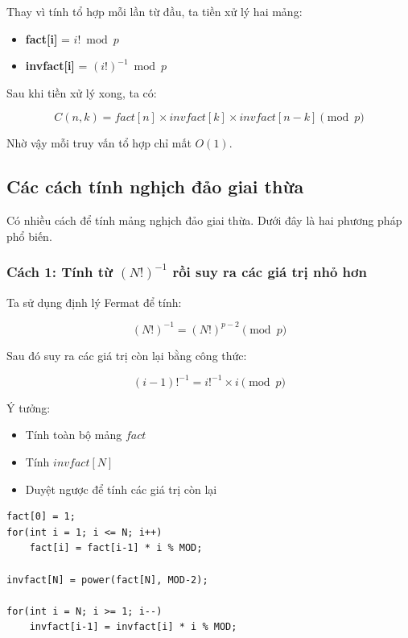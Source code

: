 Thay vì tính tổ hợp mỗi lần từ đầu, ta tiền xử lý hai mảng:

\begin{itemize}
\item \textbf{fact[i]} = $i! \bmod p$
\item \textbf{invfact[i]} = $(i!)^{-1} \bmod p$
\end{itemize}

Sau khi tiền xử lý xong, ta có:

\[
C(n,k) =
fact[n] \times invfact[k] \times invfact[n-k] \pmod p
\]

Nhờ vậy mỗi truy vấn tổ hợp chỉ mất $O(1)$.

\subsection*{Các cách tính nghịch đảo giai thừa}

Có nhiều cách để tính mảng nghịch đảo giai thừa. Dưới đây là hai phương pháp phổ biến.

\subsubsection*{Cách 1: Tính từ $(N!)^{-1}$ rồi suy ra các giá trị nhỏ hơn}

Ta sử dụng định lý Fermat để tính:

\[
(N!)^{-1} = (N!)^{p-2} \pmod p
\]

Sau đó suy ra các giá trị còn lại bằng công thức:

\[
(i-1)!^{-1} = i!^{-1} \times i \pmod p
\]

Ý tưởng:

\begin{itemize}
\item Tính toàn bộ mảng $fact$
\item Tính $invfact[N]$
\item Duyệt ngược để tính các giá trị còn lại
\end{itemize}

\begin{tcolorbox}
\begin{verbatim}
fact[0] = 1;
for(int i = 1; i <= N; i++)
    fact[i] = fact[i-1] * i % MOD;

invfact[N] = power(fact[N], MOD-2);

for(int i = N; i >= 1; i--)
    invfact[i-1] = invfact[i] * i % MOD;
\end{verbatim}
\end{tcolorbox}

